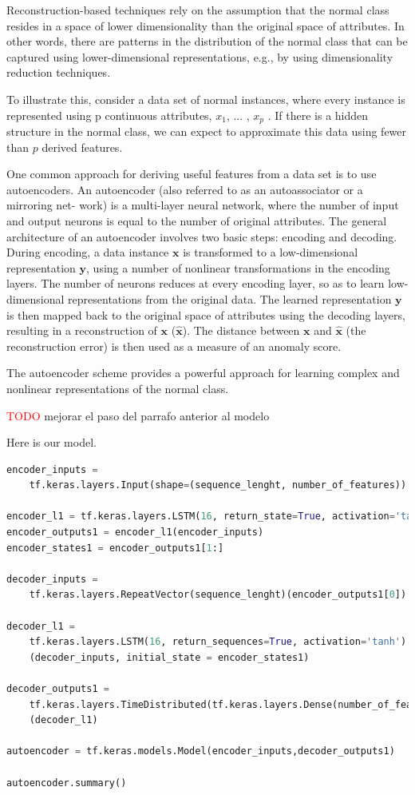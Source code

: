 Reconstruction-based techniques rely on the assumption that the normal class resides in a space of lower dimensionality than the original space of attributes.
In other words, there are patterns in the distribution of the normal class that can be captured using lower-dimensional representations, e.g., by using dimensionality reduction techniques.

To illustrate this, consider a data set of normal instances, where every instance is represented using p continuous attributes, $x_1$, ... , $x_p$ . If there is
a hidden structure in the normal class, we can expect to approximate this data using fewer than $p$ derived features.

One common approach for deriving useful features from a data set is to use autoencoders. An autoencoder (also referred to as an autoassociator or a mirroring net-
work) is a multi-layer neural network, where the number of input and output neurons is equal to the number of original attributes. The general architecture of an autoencoder involves two basic steps: encoding and decoding. During encoding, a data instance $\textbf{x}$ is transformed to a low-dimensional representation $\textbf{y}$, using a number of nonlinear transformations in the encoding layers. The number of neurons reduces at every encoding layer, so as to learn low-dimensional representations from the original data. The learned representation $\textbf{y}$ is then mapped back to the original space of attributes using the decoding layers, resulting in a reconstruction of $\textbf{x}$ ($\hat {\textbf{x}}$). The distance between $\textbf{x}$ and $\hat {\textbf{x}}$ (the reconstruction error) is then used as a measure of an anomaly score.

The autoencoder scheme provides a powerful approach for learning complex and nonlinear representations of the normal class.

\textcolor{red}{TODO} mejorar el paso del parrafo anterior al modelo

Here is our model.

\begin{lstlisting}[language=Python]
encoder_inputs = 
	tf.keras.layers.Input(shape=(sequence_lenght, number_of_features))

encoder_l1 = tf.keras.layers.LSTM(16, return_state=True, activation='tanh')
encoder_outputs1 = encoder_l1(encoder_inputs)
encoder_states1 = encoder_outputs1[1:]

decoder_inputs = 
	tf.keras.layers.RepeatVector(sequence_lenght)(encoder_outputs1[0])

decoder_l1 = 
	tf.keras.layers.LSTM(16, return_sequences=True, activation='tanh')
	(decoder_inputs, initial_state = encoder_states1)

decoder_outputs1 = 
	tf.keras.layers.TimeDistributed(tf.keras.layers.Dense(number_of_features))
	(decoder_l1)

autoencoder = tf.keras.models.Model(encoder_inputs,decoder_outputs1)

autoencoder.summary()
\end{lstlisting}

